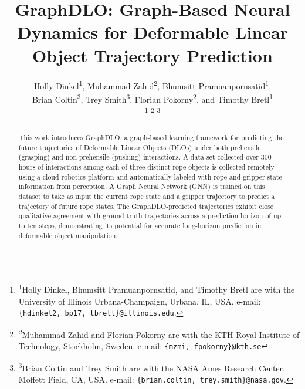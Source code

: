 \documentclass[letterpaper, 10 pt, conference]{IEEETran}
\begin{document}
\title{\LARGE \textbf{GraphDLO: Graph-Based Neural Dynamics for Deformable Linear Object Trajectory Prediction}}



\author{Holly Dinkel\textsuperscript{1}, Muhammad Zahid\textsuperscript{2}, Bhumsitt Pramuanpornsatid\textsuperscript{1},\\ Brian Coltin\textsuperscript{3}, Trey Smith\textsuperscript{3}, Florian Pokorny\textsuperscript{2}, and Timothy Bretl\textsuperscript{1}

\thanks{\textsuperscript{1}Holly Dinkel, Bhumsitt Pramuanpornsatid, and Timothy Bretl are with the University of Illinois Urbana-Champaign, Urbana, IL, USA. e-mail: \texttt{\{hdinkel2, bp17, tbretl\}@illinois.edu}.}%
\thanks{\textsuperscript{2}Muhammad Zahid and Florian Pokorny are with the KTH Royal Institute of Technology, Stockholm, Sweden. e-mail: \texttt{\{mzmi, fpokorny\}@kth.se}}
\thanks{\textsuperscript{3}Brian Coltin and Trey Smith are with the NASA Ames Research Center, Moffett Field, CA, USA. e-mail: \texttt{\{brian.coltin, trey.smith\}@nasa.gov}.}%
}

\maketitle


\begin{abstract}
This work introduces GraphDLO, a graph-based learning framework for predicting the future trajectories of Deformable Linear Objects (DLOs) under both prehensile (grasping) and non-prehensile (pushing) interactions. A data set collected over 300 hours of interactions among each of three distinct rope objects is collected remotely using a cloud robotics platform and automatically labeled with rope and gripper state information from perception. A Graph Neural Network (GNN) is trained on this dataset to take as input the current rope state and a gripper trajectory to predict a trajectory of future rope states. The GraphDLO-predicted trajectories exhibit close qualitative agreement with ground truth trajectories across a prediction horizon of up to ten steps, demonstrating its potential for accurate long-horizon prediction in deformable object manipulation.
\end{abstract}
 
\end{document}
